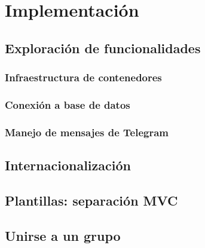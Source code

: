 \chapter{Implementación}






\section{Exploración de funcionalidades}

\subsection{Infraestructura de contenedores}


\subsection{Conexión a base de datos}


\subsection{Manejo de mensajes de Telegram}


\section{Internacionalización}


\section{Plantillas: separación MVC}


\section{Unirse a un grupo}



